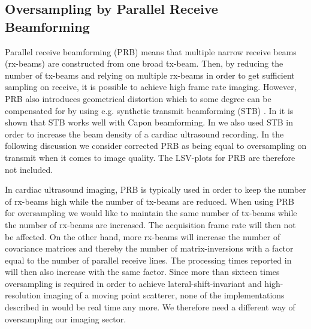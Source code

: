 \documentclass[draftcls]{IEEEtran}
\begin{document}
\subsection{Oversampling by Parallel Receive Beamforming}
Parallel receive beamforming (PRB) means that multiple narrow receive beams (rx-beams) are constructed from one broad tx-beam. Then, by reducing the number of tx-beams and relying on multiple rx-beams in order to get sufficient sampling on receive, it is possible to achieve high frame rate imaging. However, PRB also introduces geometrical distortion which to some degree can be compensated for by using e.g. synthetic transmit beamforming (STB) \cite{Hergum2007, Denarie2013}. In \cite{Rabinovich2013} it is shown that STB works well with Capon beamforming. In \cite{Asen} we also used STB in order to increase the beam density of a cardiac ultrasound recording. In the following discussion we consider corrected PRB as being equal to oversampling on transmit when it comes to image quality. The LSV-plots for PRB are therefore not included.

In cardiac ultrasound imaging, PRB is typically used in order to keep the number of rx-beams high while the number of tx-beams are reduced. When using PRB for oversampling we would like to maintain the same number of tx-beams while the number of rx-beams are increased. The acquisition frame rate will then not be affected. On the other hand, more rx-beams will increase the number of covariance matrices and thereby the number of matrix-inversions with a factor equal to the number of parallel receive lines. The processing times reported in \cite{Asen} will then also increase with the same factor. Since more than sixteen times oversampling is required in order to achieve lateral-shift-invariant and high-resolution imaging of a moving point scatterer, none of the implementations described in \cite{Asen} would be real time any more. We therefore need a different way of oversampling our imaging sector.
\end{document}
